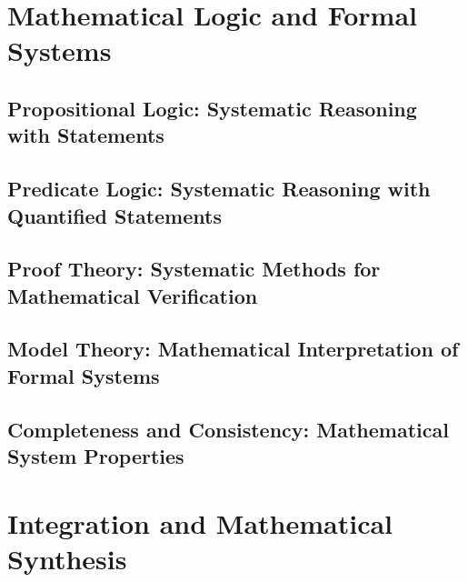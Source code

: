 \documentclass[12pt, oneside, openany]{book}
\let\oldchapter\chapter
\renewcommand{\chapter}{
	\cleardoublepage
	\thispagestyle{chapter}
	\oldchapter
}
\begin{document}
\chapter{Mathematical Logic and Formal Systems}

\section{Propositional Logic: Systematic Reasoning with Statements}

\section{Predicate Logic: Systematic Reasoning with Quantified Statements}

\section{Proof Theory: Systematic Methods for Mathematical Verification}

\section{Model Theory: Mathematical Interpretation of Formal Systems}

\section{Completeness and Consistency: Mathematical System Properties}


\chapter{Integration and Mathematical Synthesis}
\end{document}
